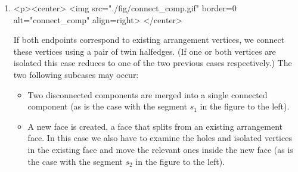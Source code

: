 \begin{enumerate}
\lcTex{%
  \setlength{\widthRight}{4.1cm}
  \setlength{\widthLeft}{\widthLineReal}
  \addtolength{\widthLeft}{-\widthRight}
  \begin{minipage}{\widthLeft}
}
\item
\begin{ccHtmlOnly}
  <p><center>
    <img src="./fig/connect_comp.gif" border=0 alt="connect_comp" align=right>
  </center>
\end{ccHtmlOnly}
If both endpoints correspond to existing arrangement
vertices, we connect these vertices using a pair of twin halfedges.
(If one or both vertices are isolated this case reduces to one of
the two previous cases respectively.) The two following subcases may
occur:
\begin{itemize}
\item Two disconnected components are merged into a single connected
component (as is the case with the segment $s_1$ in the figure to the
left).
%
\item A new face is created, a face that splits from an existing
arrangement face. In this case we also have to examine the holes and
isolated vertices in the existing face and move the relevant ones
inside the new face (as is the case with the segment $s_2$ in the
figure to the left).
\end{itemize}
\end{enumerate}

